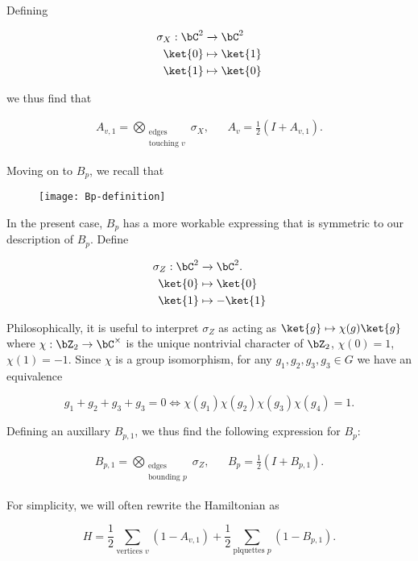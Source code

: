 Defining

\begin{align*}
\sigma_X:\bC^2&\xrightarrow{}\bC^2\\
\ket{0}&\mapsto \ket{1}\\
\ket{1}&\mapsto \ket{0}
\end{align*}

we thus find that

\begin{align*}
A_{v,1}=\bigotimes_{\substack{\text{edges} \\ \text{touching }v}}\sigma_X, && A_v=\frac{1}{2}\left(I + A_{v,1}\right).
\end{align*}

Moving on to $B_p$, we recall that

\begin{figure}[h]
\begin{center}
\texttt{[image: Bp-definition]}
\end{center}
\end{figure}

In the present case, $B_p$ has a more workable expressing that is symmetric to our description of $B_p$. Define

\begin{align*}
\sigma_Z:\bC^2&\xrightarrow{}\bC^2.\\
\ket{0}&\mapsto \ket{0}\\
\ket{1}&\mapsto -\ket{1}
\end{align*}

Philosophically, it is useful to interpret $\sigma_Z$ as acting as $\ket{g}\mapsto \chi(g)\ket{g}$ where $\chi:\bZ_2\to\bC^\times$ is the unique nontrivial character of $\bZ_2$, $\chi(0)=1$, $\chi(1)=-1$. Since $\chi$ is a group isomorphism, for any $g_1,g_2,g_3,g_3\in G$ we have an equivalence

$$g_1+g_2+g_3+g_3=0 \iff \chi(g_1)\chi(g_2)\chi(g_3)\chi(g_4)=1.$$

Defining an auxillary $B_{p,1}$, we thus find the following expression for $B_p$:

\begin{align*}
B_{p,1}=\bigotimes_{\substack{\text{edges} \\ \text{bounding }p}}\sigma_Z, && B_p=\frac{1}{2}\left(I + B_{p,1}\right).
\end{align*}

For simplicity, we will often rewrite the Hamiltonian as

$$H=\frac{1}{2}\sum_{\text{vertices }v}(1-A_{v,1})+\frac{1}{2}\sum_{\text{plquettes }p}(1-B_{p,1}).$$

